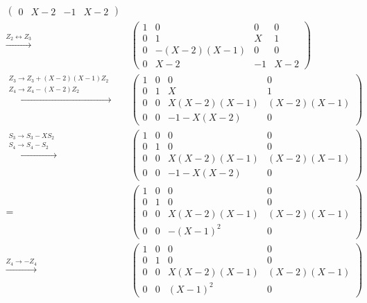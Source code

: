 \begin{align*}
\begin{pmatrix}
      0 &         X-2 &  -1 & X-2
    \end{pmatrix}
  \\
  \xrightarrow{Z_2 \leftrightarrow Z_3}&\,
    \begin{pmatrix}
      1 &           0 &   0 &   0 \\
      0 &           1 & X   &   1 \\
      0 & -(X-2)(X-1) &   0 &   0 \\
      0 &         X-2 &  -1 & X-2
    \end{pmatrix}
  \\
  \xrightarrow{\substack{Z_3 \to Z_3 + (X-2)(X-1)Z_2 \\ Z_4 \to Z_4 - (X-2) Z_2}}&\,
    \begin{pmatrix}
      1 & 0 &           0 &          0  \\
      0 & 1 &           X &          1  \\
      0 & 0 & X(X-2)(X-1) & (X-2)(X-1)  \\
      0 & 0 &   -1-X(X-2) &          0
    \end{pmatrix}
  \\
  \xrightarrow{\substack{S_3 \to S_3 - X S_2 \\ S_4 \to S_4 - S_2}}&\,
    \begin{pmatrix}
      1 & 0 &           0 &          0  \\
      0 & 1 &           0 &          0  \\
      0 & 0 & X(X-2)(X-1) & (X-2)(X-1)  \\
      0 & 0 &   -1-X(X-2) &          0
    \end{pmatrix}
  \\
  =&\,
    \begin{pmatrix}
      1 & 0 &           0 &          0  \\
      0 & 1 &           0 &          0  \\
      0 & 0 & X(X-2)(X-1) & (X-2)(X-1)  \\
      0 & 0 &    -(X-1)^2 &          0
    \end{pmatrix}
  \\
  \xrightarrow{Z_4 \to -Z_4}&\,
    \begin{pmatrix}
      1 & 0 &           0 &          0  \\
      0 & 1 &           0 &          0  \\
      0 & 0 & X(X-2)(X-1) & (X-2)(X-1)  \\
      0 & 0 &     (X-1)^2 &          0
    \end{pmatrix}

\end{align*}
